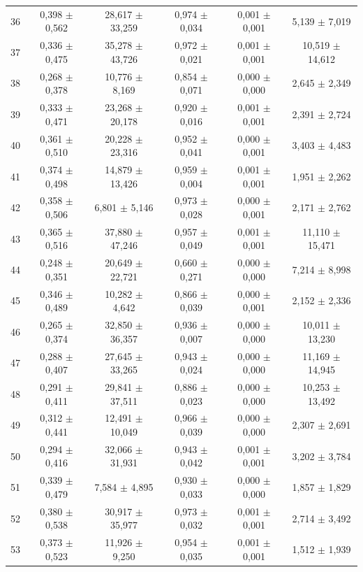 \begin{tabular}{l c c c c c}
36 & 0,398 $\pm$ 0,562 & 28,617 $\pm$ 33,259 & 0,974 $\pm$ 0,034 & 0,001 $\pm$ 0,001 & 5,139 $\pm$ 7,019 \\
37 & 0,336 $\pm$ 0,475 & 35,278 $\pm$ 43,726 & 0,972 $\pm$ 0,021 & 0,001 $\pm$ 0,001 & 10,519 $\pm$ 14,612 \\
38 & 0,268 $\pm$ 0,378 & 10,776 $\pm$ 8,169 & 0,854 $\pm$ 0,071 & 0,000 $\pm$ 0,000 & 2,645 $\pm$ 2,349 \\
39 & 0,333 $\pm$ 0,471 & 23,268 $\pm$ 20,178 & 0,920 $\pm$ 0,016 & 0,001 $\pm$ 0,001 & 2,391 $\pm$ 2,724 \\
40 & 0,361 $\pm$ 0,510 & 20,228 $\pm$ 23,316 & 0,952 $\pm$ 0,041 & 0,000 $\pm$ 0,001 & 3,403 $\pm$ 4,483 \\
41 & 0,374 $\pm$ 0,498 & 14,879 $\pm$ 13,426 & 0,959 $\pm$ 0,004 & 0,001 $\pm$ 0,001 & 1,951 $\pm$ 2,262 \\
42 & 0,358 $\pm$ 0,506 & 6,801 $\pm$ 5,146 & 0,973 $\pm$ 0,028 & 0,000 $\pm$ 0,001 & 2,171 $\pm$ 2,762 \\
43 & 0,365 $\pm$ 0,516 & 37,880 $\pm$ 47,246 & 0,957 $\pm$ 0,049 & 0,001 $\pm$ 0,001 & 11,110 $\pm$ 15,471 \\
44 & 0,248 $\pm$ 0,351 & 20,649 $\pm$ 22,721 & 0,660 $\pm$ 0,271 & 0,000 $\pm$ 0,000 & 7,214 $\pm$ 8,998 \\
45 & 0,346 $\pm$ 0,489 & 10,282 $\pm$ 4,642 & 0,866 $\pm$ 0,039 & 0,000 $\pm$ 0,001 & 2,152 $\pm$ 2,336 \\
46 & 0,265 $\pm$ 0,374 & 32,850 $\pm$ 36,357 & 0,936 $\pm$ 0,007 & 0,000 $\pm$ 0,000 & 10,011 $\pm$ 13,230 \\
47 & 0,288 $\pm$ 0,407 & 27,645 $\pm$ 33,265 & 0,943 $\pm$ 0,024 & 0,000 $\pm$ 0,000 & 11,169 $\pm$ 14,945 \\
48 & 0,291 $\pm$ 0,411 & 29,841 $\pm$ 37,511 & 0,886 $\pm$ 0,023 & 0,000 $\pm$ 0,000 & 10,253 $\pm$ 13,492 \\
49 & 0,312 $\pm$ 0,441 & 12,491 $\pm$ 10,049 & 0,966 $\pm$ 0,039 & 0,000 $\pm$ 0,000 & 2,307 $\pm$ 2,691 \\
50 & 0,294 $\pm$ 0,416 & 32,066 $\pm$ 31,931 & 0,943 $\pm$ 0,042 & 0,001 $\pm$ 0,001 & 3,202 $\pm$ 3,784 \\
51 & 0,339 $\pm$ 0,479 & 7,584 $\pm$ 4,895 & 0,930 $\pm$ 0,033 & 0,000 $\pm$ 0,000 & 1,857 $\pm$ 1,829 \\
52 & 0,380 $\pm$ 0,538 & 30,917 $\pm$ 35,977 & 0,973 $\pm$ 0,032 & 0,001 $\pm$ 0,001 & 2,714 $\pm$ 3,492 \\
53 & 0,373 $\pm$ 0,523 & 11,926 $\pm$ 9,250 & 0,954 $\pm$ 0,035 & 0,001 $\pm$ 0,001 & 1,512 $\pm$ 1,939 \\

\end{tabular}
